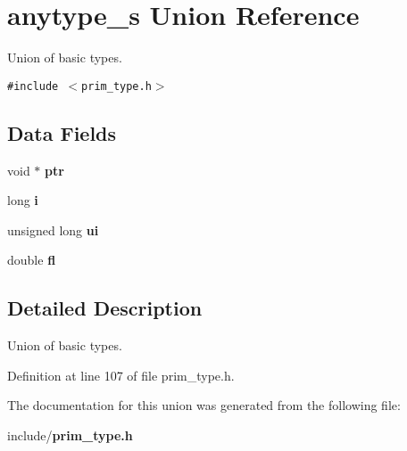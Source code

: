 \section{anytype\_\-s Union Reference}
\label{unionanytype__s}
Union of basic types.  


{\tt \#include $<$prim\_\-type.h$>$}

\subsection*{Data Fields}
\begin{CompactItemize}
\item 
void $\ast$ \textbf{ptr}\label{unionanytype__s_d06e5319b02ebff60fd00113baad6cf6}

\item 
long \textbf{i}\label{unionanytype__s_34ab20b326601115a718ed1ada34640f}

\item 
unsigned long \textbf{ui}\label{unionanytype__s_702ec3b3f98e1364ce475cd5c0d3b619}

\item 
double \textbf{fl}\label{unionanytype__s_a819b7996e6d9530340be88e0d218590}

\end{CompactItemize}


\subsection{Detailed Description}
Union of basic types. 

Definition at line 107 of file prim\_\-type.h.

The documentation for this union was generated from the following file:\begin{CompactItemize}
\item 
include/{\bf prim\_\-type.h}\end{CompactItemize}

